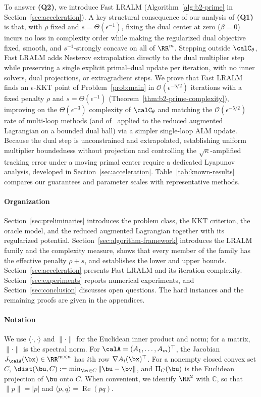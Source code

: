 To answer \textbf{(Q2)}, we introduce Fast LRALM (Algorithm~\ref{alg:b2-prime}
in Section~\ref{sec:acceleration}). A key structural consequence of our
analysis of \textbf{(Q1)} is that, with $\rho$ fixed and
$s=\Theta(\epsilon^{-1})$, fixing the dual center at zero ($\beta=0$) incurs no
loss in complexity order while making the regularized dual objective fixed,
smooth, and $s^{-1}$-strongly concave on all of $\RR^m$. Stepping outside
$\calC_\theta$, Fast LRALM adds Nesterov extrapolation directly to the dual
multiplier step while preserving a single explicit primal--dual update per
iteration, with no inner solvers, dual projections, or extragradient steps.
We prove that Fast LRALM finds an $\epsilon$-KKT point of
Problem~\eqref{prob:main} in $\mathcal O(\epsilon^{-5/2})$ iterations with a
fixed penalty $\rho$ and $s=\Theta(\epsilon^{-1})$
(Theorem~\ref{thm:b2-prime-complexity}), improving on the
$\Theta(\epsilon^{-3})$ complexity of $\calC_\theta$ and matching the
$\mathcal O(\epsilon^{-5/2})$ rate of multi-loop methods (and
of~\cite{zhang2026matching} applied to the reduced augmented Lagrangian on a
bounded dual ball) via a simpler single-loop ALM update. Because the dual step
is unconstrained and extrapolated, establishing uniform multiplier boundedness
without projection and controlling the $\sqrt{\kappa}$-amplified tracking error
under a moving primal center require a dedicated Lyapunov analysis, developed
in Section~\ref{sec:acceleration}. Table~\ref{tab:known-results} compares our
guarantees and parameter scales with representative methods.

\paragraph{Organization}
Section~\ref{sec:preliminaries} introduces the problem class, the KKT
criterion, the oracle model, and the reduced augmented Lagrangian together with
its regularized potential.
Section~\ref{sec:algorithm-framework} introduces the LRALM family and the
complexity measure, shows that every member of the family has the effective
penalty $\rho+s$, and establishes the lower and upper bounds.
Section~\ref{sec:acceleration} presents Fast LRALM and its iteration
complexity. Section~\ref{sec:experiments} reports numerical experiments, and
Section~\ref{sec:conclusion} discusses open questions. The hard instances
and the remaining proofs are given in the appendices.

\paragraph{Notation}
We use $\langle\cdot,\cdot\rangle$ and $\|\cdot\|$ for the
Euclidean inner product and norm; for a matrix, $\|\cdot\|$ is the spectral
norm. For $\calA=(A_1,\ldots,A_m)^\top$, the Jacobian
$J_{\calA}(\bx)\in\RR^{m\times n}$ has $i$th row $\nabla A_i(\bx)^\top$. For a
nonempty closed convex set $C$, $\dist(\bu,C):=\min_{\bv\in C}\|\bu-\bv\|$, and
$\Pi_C(\bu)$ is the Euclidean projection of $\bu$ onto $C$. When convenient, we
identify $\RR^2$ with $\mathbb C$, so that $\|p\|=|p|$ and
$\langle p,q\rangle=\operatorname{Re}(\bar pq)$.


